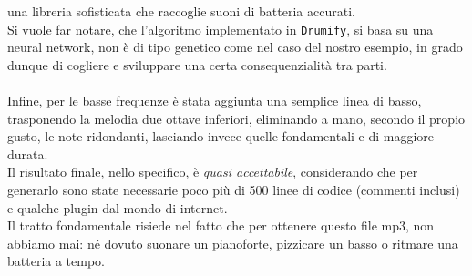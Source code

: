 \documentclass[a4paper,12pt]{report}
\begin{document}
una libreria sofisticata che raccoglie suoni di batteria accurati. \\
Si vuole far notare, che l'algoritmo implementato in \texttt{Drumify}, si basa su una neural network, non è di tipo genetico come nel caso del nostro esempio, in grado dunque di cogliere e sviluppare una certa consequenzialità tra parti. \\
\\
Infine, per le basse frequenze è stata aggiunta una semplice linea di basso, trasponendo la melodia due ottave inferiori, eliminando a mano, secondo il propio gusto, le note ridondanti, lasciando invece quelle fondamentali e di maggiore durata. \\
Il risultato finale, nello specifico, è \textit{quasi accettabile}, considerando che per generarlo sono state necessarie poco più di 500 linee di codice (commenti inclusi) e qualche plugin dal mondo di internet. \\
Il tratto fondamentale risiede nel fatto che per ottenere questo file mp3, non abbiamo mai: né dovuto suonare un pianoforte, pizzicare un basso o ritmare una batteria a tempo. \\
\\
\end{document}
